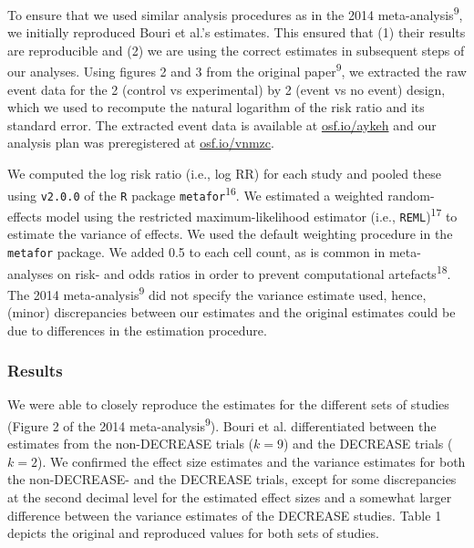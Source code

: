 \documentclass[]{article}
\begin{document}
To ensure that we used similar analysis procedures as in the 2014
meta-analysis\textsuperscript{9}, we initially reproduced Bouri et al.'s
estimates. This ensured that (1) their results are reproducible and (2)
we are using the correct estimates in subsequent steps of our analyses.
Using figures 2 and 3 from the original paper\textsuperscript{9}, we
extracted the raw event data for the 2 (control vs experimental) by 2
(event vs no event) design, which we used to recompute the natural
logarithm of the risk ratio and its standard error. The extracted event
data is available at \href{https://osf.io/aykeh}{osf.io/aykeh} and our
analysis plan was preregistered at
\href{https://osf.io/vnmzc}{osf.io/vnmzc}.

We computed the log risk ratio (i.e., log RR) for each study and pooled
these using \texttt{v2.0.0} of the \texttt{R} package
\texttt{metafor}\textsuperscript{16}. We estimated a weighted
random-effects model using the restricted maximum-likelihood estimator
(i.e., \texttt{REML})\textsuperscript{17} to estimate the variance of
effects. We used the default weighting procedure in the \texttt{metafor}
package. We added 0.5 to each cell count, as is common in meta-analyses
on risk- and odds ratios in order to prevent computational
artefacts\textsuperscript{18}. The 2014 meta-analysis\textsuperscript{9}
did not specify the variance estimate used, hence, (minor) discrepancies
between our estimates and the original estimates could be due to
differences in the estimation procedure.

\subsubsection{Results}\label{results}

We were able to closely reproduce the estimates for the different sets
of studies (Figure 2 of the 2014 meta-analysis\textsuperscript{9}).
Bouri et al. differentiated between the estimates from the non-DECREASE
trials (\(k=9\)) and the DECREASE trials (\(k=2\)). We confirmed the
effect size estimates and the variance estimates for both the
non-DECREASE- and the DECREASE trials, except for some discrepancies at
the second decimal level for the estimated effect sizes and a somewhat
larger difference between the variance estimates of the DECREASE
studies. Table 1 depicts the original and reproduced values for both
sets of studies.
\end{document}
